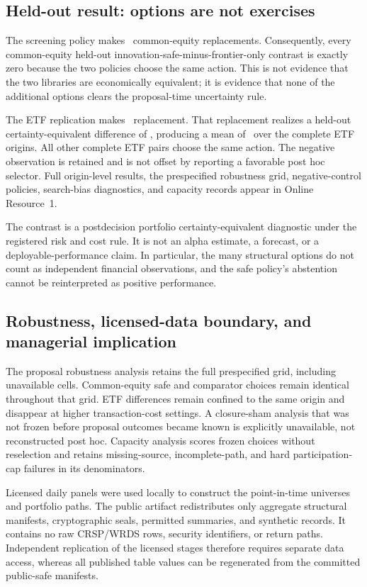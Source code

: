 \subsection{Held-out result: options are not exercises}

The screening policy makes \AORPointInTimeEquityPolicyReplacements\
common-equity replacements. Consequently, every common-equity held-out
innovation-safe-minus-frontier-only contrast is exactly zero because the two
policies choose the same action. This is not evidence that the two libraries
are economically equivalent; it is evidence that none of the additional
options clears the proposal-time uncertainty rule.

The ETF replication makes \AORPointInTimeETFPolicyReplacements\ replacement.
That replacement realizes a held-out certainty-equivalent difference of
\AORPointInTimeETFMinimumCE, producing a mean of
\AORPointInTimeETFMeanCE\ over the complete ETF origins. All other complete ETF
pairs choose the same action. The negative observation is retained and is not
offset by reporting a favorable post hoc selector. Full origin-level results,
the prespecified robustness grid, negative-control policies, search-bias
diagnostics, and capacity records appear in Online Resource~1.

The contrast is a postdecision portfolio certainty-equivalent diagnostic under
the registered risk and cost rule. It is not an alpha estimate, a forecast, or
a deployable-performance claim. In particular, the many structural options do
not count as independent financial observations, and the safe policy's
abstention cannot be reinterpreted as positive performance. \subsection{Robustness, licensed-data boundary, and managerial implication}

The proposal robustness analysis retains the full prespecified grid, including
unavailable cells. Common-equity safe and comparator choices remain identical
throughout that grid. ETF differences remain confined to the same origin and
disappear at higher transaction-cost settings. A closure-sham analysis that
was not frozen before proposal outcomes became known is explicitly unavailable,
not reconstructed post hoc. Capacity analysis scores frozen choices without
reselection and retains missing-source, incomplete-path, and hard participation-
cap failures in its denominators.

Licensed daily panels were used locally to construct the point-in-time
universes and portfolio paths. The public artifact redistributes only aggregate
structural manifests, cryptographic seals, permitted summaries, and synthetic
records. It contains no raw CRSP/WRDS rows, security identifiers, or return
paths. Independent replication of the licensed stages therefore requires
separate data access, whereas all published table values can be regenerated
from the committed public-safe manifests.

